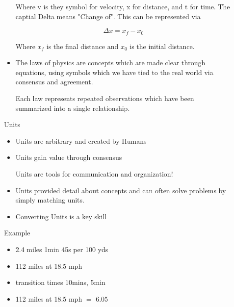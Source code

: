 \documentclass{report}
\begin{document}
\begin{description}
\begin{mdframed}
\begin{itemize}
                   Where v is they symbol for velocity,
                   x for distance, and t for time. The captial
                   Delta means "Change of". This can be represented
                   via

                   \begin{displaymath}
                        \Delta x = x_f - x_0
                   \end{displaymath}

                   Where $x_f$ is the final distance and 
                    $x_0$ is the initial distance.

                \item The laws of physics are concepts which are
                    made clear through equations, using symbols
                    which we have tied to the real world via
                    consensus and agreement.

                    Each law represents repeated observations
                    which have been summarized into a single
                    relationship.
            \end{itemize}
        \end{mdframed}

        \begin{mdframed}
            {\large Units}
            \begin{itemize}
                \item Units are arbitrary and created by Humans
                \item Units gain value through consensus
                    \begin{mdframed}
                        Units are tools for communication and
                        organization!
                    \end{mdframed}
                \item Units provided detail about concepts and
                    can often solve problems by simply matching
                    units.
                \item Converting Units is a key skill
            \end{itemize}
            \begin{mdframed}
                Example
                \begin{itemize}
                    \item 2.4 miles 1min 45s per 100 yds
                    \item 112 miles at 18.5 mph
                    \item transition times 10mins, 5min
                \end{itemize}
                \begin{itemize}
                    \item 112 miles at 18.5 mph $=$ 6.05
                \end{itemize}
            \end{mdframed}
        \end{mdframed}
\end{description}
\end{document}
